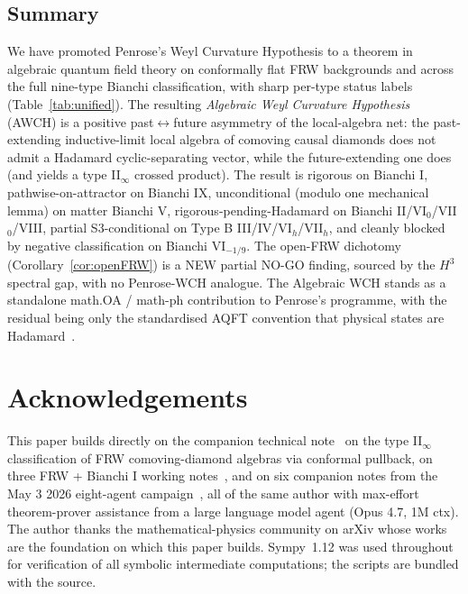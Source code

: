 \documentclass[11pt]{article}
\theoremstyle{definition}
\begin{document}
\subsection{Summary}\label{sec:summary}

We have promoted Penrose's Weyl Curvature Hypothesis to a theorem in algebraic quantum field theory on conformally flat FRW backgrounds and across the full nine-type Bianchi classification, with sharp per-type status labels (Table~\ref{tab:unified}). The resulting \emph{Algebraic Weyl Curvature Hypothesis} (AWCH) is a positive past$\leftrightarrow$future asymmetry of the local-algebra net: the past-extending inductive-limit local algebra of comoving causal diamonds does not admit a Hadamard cyclic-separating vector, while the future-extending one does (and yields a type II$_\infty$ crossed product). The result is rigorous on Bianchi I, pathwise-on-attractor on Bianchi IX, unconditional (modulo one mechanical lemma) on matter Bianchi V, rigorous-pending-Hadamard on Bianchi II/VI$_0$/VII$_0$/VIII, partial S3-conditional on Type B III/IV/VI$_h$/VII$_h$, and cleanly blocked by negative classification on Bianchi VI$_{-1/9}$. The open-FRW dichotomy (Corollary~\ref{cor:openFRW}) is a NEW partial NO-GO finding, sourced by the $H^3$ spectral gap, with no Penrose-WCH analogue. The Algebraic WCH stands as a standalone math.OA / math-ph contribution to Penrose's programme, with the residual being only the standardised AQFT convention that physical states are Hadamard~\cite{HollandsWald2001,BrunettiFredenhagenVerch2003}.

\section*{Acknowledgements}

This paper builds directly on the companion technical note~\cite{frw_note} on the type II$_\infty$ classification of FRW comoving-diamond algebras via conformal pullback, on three FRW + Bianchi I working notes~\cite{algebraic_arrow,bianchi_extension_opus,T2_bianchi_extension}, and on six companion notes from the May 3 2026 eight-agent campaign~\cite{T2_bianchi_IX_note,T2_bianchi_V_note,T2_bianchi_typeA_note,T2_bianchi_typeB_note,hadamard_BIX_note,hadamard_BV_note}, all of the same author with max-effort theorem-prover assistance from a large language model agent (Opus 4.7, 1M ctx). The author thanks the mathematical-physics community on arXiv whose works~\cite{Witten2022,CLPW2023,FaulknerSperanza2024,BrunettiFredenhagenVerch2003,HollandsWald2001,Verch1994,BanerjeeNiedermaier2023,Connes1973,HislopLongo1982,DHN2002,HeinzleUgglaAttractor2009,Brehm2016,Ringstrom2019,HewittWainwright1993,HewittHorwoodWainwright2003,RyanWaller1997,Lebedev1965,Helgason2008} are the foundation on which this paper builds. Sympy~1.12 was used throughout for verification of all symbolic intermediate computations; the scripts are bundled with the source.



\end{document}
